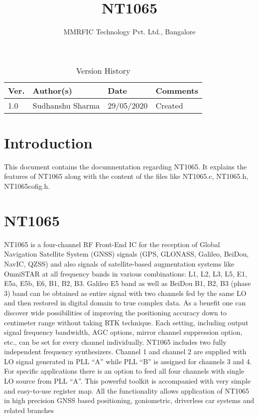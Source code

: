 \documentclass[12pt,a4paper,onecolumn]{article}
\author{MMRFIC Technology Pvt. Ltd., Bangalore}
\title{NT1065}
\begin{document}
\maketitle
\vfill

\begin{table}[h]
\begin{center}
\begin{tabular}{llll}
\hline
Ver. & Author(s) & Date & Comments \\
\hline \hline
1.0 & Sudhanshu Sharma & 29/05/2020 & Created \\%
\hline
\end{tabular}
\caption{Version History}
\end{center}
\end{table}
\newpage
\tableofcontents
\newpage
\section{Introduction}
This document contains the documnentation regarding NT1065. It explains the features of NT1065 along with the content of the files like NT1065.c, NT1065.h, NT1065cofig.h. 
\section{NT1065}
NT1065 is a four-channel RF Front-End IC for the reception of Global Navigation Satellite System (GNSS) signals (GPS, GLONASS, Galileo, BeiDou, NavIC, QZSS) and also signals of satellite-based augmentation systems like OmniSTAR at all frequency bands in various combinations: L1, L2, L3, L5, E1, E5a, E5b, E6, B1, B2, B3. Galileo E5 band as well as BeiDou B1, B2, B3 (phase 3) band can be obtained as entire signal with two channels fed by the same LO and then restored in digital domain to true complex data. As a benefit one can discover wide possibilities of improving the positioning accuracy down to centimeter range without taking RTK technique. Each setting, including output signal frequency bandwidth, AGC options, mirror channel suppression option, etc., can be set for every channel individually. NT1065 includes two fully independent frequency synthesizers. Channel 1 and channel 2 are supplied with LO signal generated in PLL “A” while PLL “B” is assigned for channels 3 and 4. For specific applications there is an option to feed all four channels with single LO source from PLL “A”. This powerful toolkit is accompanied with very simple and easy-to-use register map. All the functionality allows application of NT1065 in high precision GNSS based positioning, goniometric, driverless car systems and related branches
\end{document}
